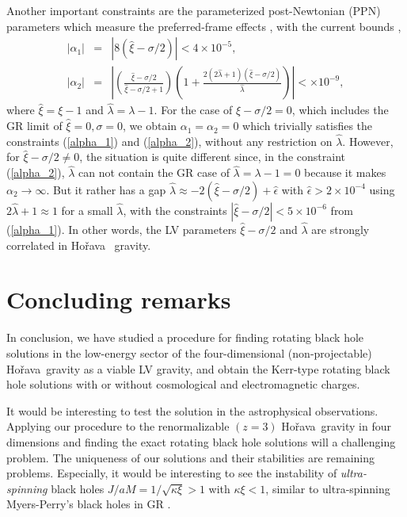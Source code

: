\documentclass[preprint,aps,tightenlines,showkeys,nofootinbib,superscriptaddress]{revtex4}
\newcommand{\beq}{\begin{eqnarray}}
\newcommand{\eeq}{\end{eqnarray}}
\newcommand{\al}{{\alpha}}
\newcommand{\ep}{{\epsilon}}
\newcommand{\ka}{\kappa}
\newcommand{\la}{{\lambda}}
\newcommand{\si}{{\sigma}}
\newcommand{\f}{\frac}
\newcommand{\ra}{\rightarrow}
\newcommand{\Ho}{Ho\v{r}ava}
\begin{document}
Another important constraints are the parameterized post-Newtonian (PPN) parameters which measure the preferred-frame effects \cite{Blas:2011,Emir:2017}, with the current bounds \cite{Will:2014},
\beq
|\al_1|&=&|8 (\widehat{\xi}-\si/2)| < 4 \times 10^{-5},\label{alpha_1} \\
|\al_2|&=&\left|\left(\f{\widehat{\xi}-\si/2}{\widehat{\xi}-\si/2+1}\right)
\left(1+\f{2 (2 \widehat{\la}+1) (\widehat{\xi}-\si/2)}{\widehat{\la}} \right)\right| < \times 10^{-9},\label{alpha_2}
\eeq
where $\widehat{\xi}=\xi-1$ and $\widehat{\la}=\la-1$.
For the case of $\widehat{\xi}-\si/2=0$, which includes the GR limit of
$\widehat{\xi}=0, \si=0$, we obtain $\al_1=\al_2=0$ which trivially satisfies
the constraints (\ref{alpha_1}) and (\ref{alpha_2}), without any restriction on
$\widehat{\la}$. However, for $\widehat{\xi}-\si/2\neq 0$, the situation is quite
different since, in the constraint (\ref{alpha_2}), $\widehat{\la}$ can not
contain the GR case of $\widehat{\la}=\la-1=0$ because it makes $\al_2\ra \infty$.
But it rather has a gap
$\widehat{\la} \approx -2 (\widehat{\xi}-\si/2)+\widehat{\ep}$ with $\widehat{\ep}>2 \times 10^{-4}$ using $2 \widehat{\la} +1 \approx 1$ for a small $\widehat{\la}$, with the constraints $|\widehat{\xi}-\si/2|< 5 \times 10^{-6}$ from (\ref{alpha_1}). In other words, the LV parameters $\widehat{\xi}-\si/2$ and $\widehat{\la}$ are strongly correlated in \Ho~ gravity.

\section{Concluding remarks}

In conclusion, we have studied a procedure for finding rotating black hole solutions in the low-energy sector of the four-dimensional (non-projectable) \Ho~gravity as a viable LV gravity, and obtain the Kerr-type rotating black hole solutions with or without cosmological and electromagnetic charges.

It would be interesting to test the solution in the astrophysical observations. Applying our procedure to the renormalizable $(z=3)$ \Ho~gravity in four dimensions and finding the exact rotating black hole solutions will a challenging problem. The uniqueness of our solutions and their stabilities are remaining problems. Especially, it would be interesting to see the instability of {\it ultra-spinning} black holes $J/aM=1/\sqrt{\ka \xi}>1$ with $\ka \xi < 1$, similar to ultra-spinning Myers-Perry's black holes in GR \cite{Empa:2003}.\\
\end{document}
